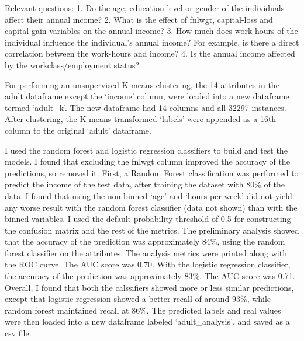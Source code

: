\documentclass[11pt]{article}
\begin{document}
Relevant questions: 1. Do the age, education level or gender of the
individuals affect their annual income? 2. What is the effect of fnlwgt,
capital-loss and capital-gain variables on the annual income? 3. How
much does work-hours of the individual influence the individual's annual
income? For example, is there a direct correlation between the
work-hours and income? 4. Is the annual income affected by the
workclass/employment status?

For performing an unsupervised K-means clustering, the 14 attributes in
the adult dataframe except the `income' column, were loaded into a new
dataframe termed `adult\_k'. The new dataframe had 14 columns and all
32297 instances. After clustering, the K-means transformed `labels' were
appended as a 16th column to the original `adult' dataframe.

I used the random forest and logistic regression classifiers to build
and test the models. I found that excluding the fnlwgt column improved
the accuracy of the predictions, so removed it. First, a Random Forest
classification was performed to predict the income of the test data,
after training the dataset with 80\% of the data. I found that using the
non-binned `age' and `hours-per-week' did not yield any worse result
with the random forest classifier (data not shown) than with the binned
variables. I used the default probability threshold of 0.5 for
constructing the confusion matrix and the rest of the metrics. The
preliminary analysis showed that the accuracy of the prediction was
approximately 84\%, using the random forest classifier on the
attributes. The analysis metrics were printed along with the ROC curve.
The AUC score was 0.70. With the logistic regression classifier, the
accuracy of the prediction was approximately 83\%. The AUC score was
0.71. Overall, I found that both the calssifiers showed more or less
similar predictions, except that logistic regression showed a better
recall of around 93\%, while random forest maintained recall at 86\%.
The predicted labels and real values were then loaded into a new
dataframe labeled `adult\_analysis', and saved as a csv file.


    
    
    
    
\end{document}
